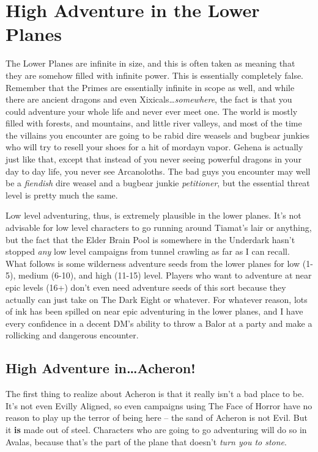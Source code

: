 \section{High Adventure in the Lower Planes}

The Lower Planes are infinite in size, and this is often taken as meaning that they are somehow filled with infinite power. This is essentially completely false. Remember that the Primes are essentially infinite in scope as well, and while there are ancient dragons and even Xixicals\ldots \textit{somewhere}, the fact is that you could adventure your whole life and never ever meet one. The world is mostly filled with forests, and mountains, and little river valleys, and most of the time the villains you encounter are going to be rabid dire weasels and bugbear junkies who will try to resell your shoes for a hit of mordayn vapor. Gehena is actually just like that, except that instead of you never seeing powerful dragons in your day to day life, you never see Arcanoloths. The bad guys you encounter may well be a \textit{fiendish} dire weasel and a bugbear junkie \textit{petitioner}, but the essential threat level is pretty much the same.

Low level adventuring, thus, is extremely plausible in the lower planes. It's not advisable for low level characters to go running around Tiamat's lair or anything, but the fact that the Elder Brain Pool is somewhere in the Underdark hasn't stopped \textit{any} low level campaigns from tunnel crawling as far as I can recall. What follows is some wilderness adventure seeds from the lower planes for low (1-5), medium (6-10), and high (11-15) level. Players who want to adventure at near epic levels (16+) don't even need adventure seeds of this sort because they actually can just take on The Dark Eight or whatever. For whatever reason, lots of ink has been spilled on near epic adventuring in the lower planes, and I have every confidence in a decent DM's ability to throw a Balor at a party and make a rollicking and dangerous encounter.


\subsection{High Adventure in\ldots Acheron!}

The first thing to realize about Acheron is that it really isn't a bad place to be. It's not even Evilly Aligned, so even campaigns using The Face of Horror have no reason to play up the terror of being here -- the sand of Acheron is not Evil. But it \textbf{is} made out of steel. Characters who are going to go adventuring will do so in Avalas, because that's the part of the plane that doesn't \textit{turn you to stone}.

